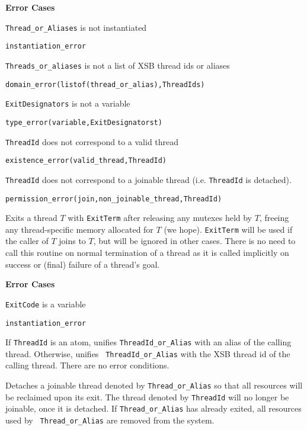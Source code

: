 \begin{description}
{\bf Error Cases}
\bi
\item 	{\tt Thread\_or\_Aliases} is not instantiated
\bi
\item 	{\tt instantiation\_error}
\ei
%
\item 	{\tt Threads\_or\_aliases} is not a list of XSB thread ids or aliases
\bi
\item 	{\tt domain\_error(listof(thread\_or\_alias),ThreadIds)}
\ei
%
\item 	{\tt ExitDesignators} is not a variable
\bi
\item 	{\tt type\_error(variable,ExitDesignatorst)}
\ei
%
\item   {\tt ThreadId} does not correspond to a valid thread
\bi
\item   {\tt existence\_error(valid\_thread,ThreadId)}
\ei
\item   {\tt ThreadId} does not correspond to a joinable thread
  (i.e. {\tt ThreadId} is detached).
\bi
\item   {\tt permission\_error(join,non\_joinable\_thread,ThreadId)}
\ei
\ei


%
Exits a thread $T$ with {\tt ExitTerm} after releasing any mutexes
held by $T$, freeing any thread-specific memory allocated for $T$ (we
hope).  {\tt ExitTerm} will be used if the caller of $T$ joins to $T$,
but will be ignored in other cases.  There is no need to call this
routine on normal termination of a thread as it is called implicitly
on success or (final) failure of a thread's goal.

{\bf Error Cases}
\bi
\item 	{\tt ExitCode} is a variable
\bi
\item 	{\tt instantiation\_error}
\ei
\ei

%
If {\tt ThreadId} is an atom, unifies {\tt ThreadId\_or\_Alias} with
an alias of the calling thread.  Otherwise, unifies {\tt
  ThreadId\_or\_Alias} with the XSB thread id of the calling thread.
There are no error conditions.


%
Detaches a joinable thread denoted by {\tt Thread\_or\_Alias} so that
all resources will be reclaimed upon its exit.  The thread denoted by
{\tt ThreadId} will no longer be joinable, once it is detached.  If
{\tt Thread\_or\_Alias} has already exited, all resources used by {\tt
  Thread\_or\_Alias} are removed from the system.


\end{description}
